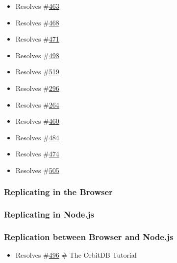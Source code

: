 \begin{itemize}
\tightlist
\item
  Resolves \#\href{https://github.com/orbitdb/orbit-db/issues/463}{463}
\item
  Resolves \#\href{https://github.com/orbitdb/orbit-db/issues/468}{468}
\item
  Resolves \#\href{https://github.com/orbitdb/orbit-db/issues/471}{471}
\item
  Resolves \#\href{https://github.com/orbitdb/orbit-db/issues/498}{498}
\item
  Resolves \#\href{https://github.com/orbitdb/orbit-db/issues/519}{519}
\item
  Resolves \#\href{https://github.com/orbitdb/orbit-db/issues/296}{296}
\item
  Resolves \#\href{https://github.com/orbitdb/orbit-db/issues/264}{264}
\item
  Resolves \#\href{https://github.com/orbitdb/orbit-db/issues/460}{460}
\item
  Resolves \#\href{https://github.com/orbitdb/orbit-db/issues/484}{484}
\item
  Resolves \#\href{https://github.com/orbitdb/orbit-db/issues/474}{474}
\item
  Resolves \#\href{https://github.com/orbitdb/orbit-db/issues/505}{505}
\end{itemize}

\subsubsection{Replicating in the
Browser}\label{replicating-in-the-browser}

\subsubsection{Replicating in Node.js}\label{replicating-in-node.js}

\subsubsection{Replication between Browser and
Node.js}\label{replication-between-browser-and-node.js}

\begin{itemize}
\tightlist
\item
  Resolves \#\href{https://github.com/orbitdb/orbit-db/issues/496}{496}
  \# The OrbitDB Tutorial
\end{itemize}

